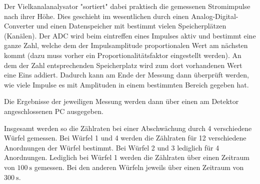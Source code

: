 Der Vielkanalanalysator "sortiert" dabei praktisch die gemessenen Stromimpulse nach ihrer Höhe.
Dies geschieht im wesentlichen durch einen Analog-Digital-Converter und einen Datenspeicher mit bestimmt vielen
Speicherplätzen (Kanälen). Der ADC wird beim eintreffen eines Impulses aktiv und bestimmt eine ganze Zahl, welche
dem der Impulsamplitude proportionalen Wert am nächsten kommt (dazu muss vorher ein Proportionalitätsfaktor eingestellt
werden). An dem der Zahl entsprechenden Speicherplatz wird zum dort vorhandenen Wert eine Eins addiert. Dadurch
kann am Ende der Messung dann überprüft werden, wie viele Impulse es mit Amplituden in einem bestimmten Bereich gegeben hat.

Die Ergebnisse der jeweiligen Messung werden dann über einen am Detektor angeschlossenen PC ausgegeben.

Insgesamt werden so die Zählraten bei einer Abschwächung durch 4 verschiedene Würfel gemessen.
Bei Würfel 1 und 4 werden die Zählraten für 12 verschiedene Anordnungen der Würfel bestimmt.
Bei Würfel 2 und 3 lediglich für 4 Anordnungen. Lediglich bei Würfel 1 werden die Zählraten über einen
Zeitraum von $\SI{100}{\second}$ gemessen. Bei den anderen Würfeln jeweils über einen
Zeitraum von $\SI{300}{\second}$.
